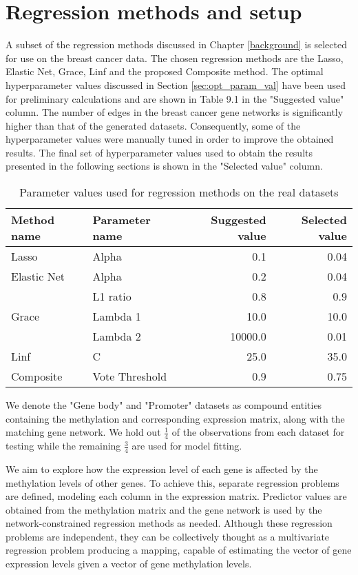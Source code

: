 \section{Regression methods and setup}
A subset of the regression methods discussed in Chapter \ref{background} is selected for use on the breast cancer data. The chosen regression methods are the Lasso, Elastic Net, Grace, Linf and the proposed Composite method.
The optimal hyperparameter values discussed in Section \ref{sec:opt_param_val} have been used for preliminary calculations and are shown in Table 
9.1 %
in the "Suggested value" column. The number of edges in the breast cancer gene networks is significantly higher than that of the generated datasets. Consequently, some of the hyperparameter values were manually tuned in order to improve the obtained results. The final set of hyperparameter values used to obtain the results presented in the following sections is shown in the "Selected value" column.

{\def\arraystretch{1.5}\tabcolsep=10pt
	\begin{table}[H]
		\label{tab:numbering_hack}
		\caption{Parameter values used for regression methods on the real datasets}
		\centering
		\begin{tabular}{l l r r}
			\hline\hline 
			Method name & Parameter name & Suggested value & Selected value\\
			\hline\hline
			Lasso	&	Alpha	&	0.1	&	0.04\\
			\hline
			Elastic Net	&	Alpha	&	0.2	&	0.04\\
						&	L1 ratio&	0.8	&	0.9\\
			\hline
			Grace	&	Lambda 1	&	10.0	&	10.0\\
					&	Lambda 2	&	10000.0	&	0.01\\
			\hline
			Linf	&	C	&	25.0	&	35.0\\
			\hline
			Composite	&	Vote Threshold	&	0.9	&	0.75\\
			\hline
		\end{tabular}
	\end{table}
}

We denote the "Gene body" and "Promoter" datasets as compound entities containing the methylation and corresponding expression matrix, along with the matching gene network. We hold out $\frac{1}{4}$ of the observations from each dataset for testing while the remaining $\frac{3}{4}$ are used for model fitting.

We aim to explore how the expression level of each gene is affected by the methylation levels of other genes. To achieve this, separate regression problems are defined, modeling each column in the expression matrix. Predictor values are obtained from the methylation matrix and the gene network is used by the network-constrained regression methods as needed. Although these regression problems are independent, they can be collectively thought as a multivariate regression problem producing a mapping, capable of estimating the vector of gene expression levels given a vector of gene methylation levels.


